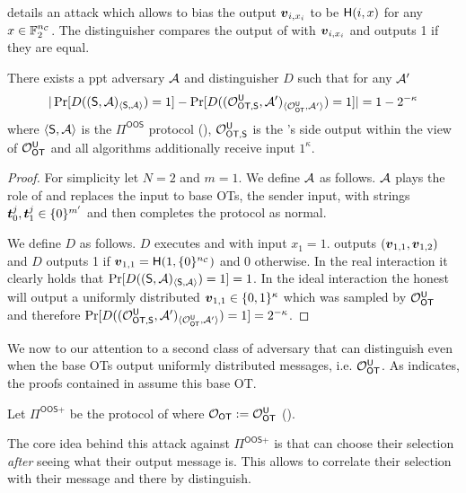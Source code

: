  details an attack which allows \R to bias the output $\vv_{i,x_i}$ to be $\H(i,x)$ for any $x\in\mathbb{F}^{\nc}_2$. The distinguisher compares the output of \send with $\vv_{i,x_i}$ and outputs 1 if they are equal. 


\begin{lemma} \label{lem:malRec}
	There exists a ppt adversary $\Adv$ and distinguisher $D$ such that for any $\Adv'$ 
	$$
	|\Pr[D((\send, \Adv)_{\langle\send, \Adv\rangle})=1]-\Pr[D((\O^{\U}_{\textsf{OT,\send}}, \Adv')_{\langle\OOT^\U, \Adv'\rangle})=1]|=1-2^{-\kappa}
	$$
	where $\langle\send, \Adv\rangle$ is the $\Pi^{\textsf{OOS}}$ protocol (), $\O^{\U}_{\textsf{OT,\send}}$ is the \send's side output within the view of $\OOT^{\U}$ and all algorithms additionally receive input $1^\kappa$. 
\end{lemma}
\begin{proof}
	For simplicity let $N=2$ and $m=1$. We define $\Adv$ as follows. $\Adv$ plays the role of \rec and replaces the input to base OTs, the sender input, with strings $\tt_0^j,\tt_1^j\in \{0\}^{m'}$ and then completes the protocol as normal.
	
	We define $D$ as follows. $D$ executes \send and \Adv with input $x_1=1$. \send outputs $(\vv_{1,1},\vv_{1,2})$ and $D$ outputs 1 if $\vv_{1,1}=\H(1, \{0\}^\nc)$ and 0 otherwise. In the real interaction it clearly holds that $\Pr[D((\send, \Adv)_{\langle\send, \Adv\rangle})=1]=1$. In the ideal interaction the honest \send will output a uniformly distributed $\vv_{1,1}\in\{0,1\}^\kappa$ which was sampled by $\OOT^{\U}$ and therefore $\Pr[D((\O^{\U}_{\textsf{OT,\send}}, \Adv')_{\langle\OOT^\U, \Adv'\rangle})=1]=2^{-\kappa}$.
\end{proof}



We now to our attention to a second class of adversary that can distinguish even when the base OTs output uniformly distributed messages, i.e. $\OOT^\U$. As  indicates, the proofs contained in \cite{RSA:OrrOrsSch17} assume this base OT.

\begin{definition}\label{def:OOS2}
	Let $\Pi^{\textsf{OOS+}}$ be the protocol of  where $\OOT:=\OOT^\U$ ().
\end{definition}


The core idea behind this attack against $\Pi^{\textsf{OOS+}}$ is that \rec can choose their selection \emph{after} seeing what their output message is. This allows \rec to correlate their selection with their message and there by distinguish.

